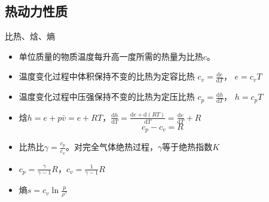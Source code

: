 \subsection{热动力性质}
\begin{frame}{比热、焓、熵}
  \begin{itemize}[<+-|alert@+>]
    \item 单位质量的物质温度每升高一度所需的热量为{\color{blue}比热\color{red}$c$}。
    \item 温度变化过程中体积保持不变的比热为{\color{blue}定容比热
      \color{red}$\displaystyle c_{v} = \frac{\mathrm{d}e}{\mathrm{d}T}$}，
      $e=c_{v}T$
    \item 温度变化过程中压强保持不变的比热为{\color{blue}定压比热
      \color{red}$\displaystyle c_{p}=\frac{\mathrm{d}h}{\mathrm{d}T} $}，
      $h=c_{p}T$
    \item {\color{blue}焓\color{red}$h= e + p\bar{v} = e + RT$}，$\displaystyle
      \frac{\mathrm{d} h}{\mathrm{d} T}
      =
      \frac{\mathrm{d} e + \mathrm{d}(RT)}{\mathrm{d} T}
      =
      \frac{\mathrm{d} e}{\mathrm{d} T}
      +
      R
      $
      \begin{equation*}
        c_{p} - c_{v} = R
      \end{equation*}
    \item {\color{blue}比热比\color{red}$\displaystyle \gamma=\frac{c_{p}}{c_{v}}$}。对完全气体绝热过程，$\gamma$等于绝热指数$K$
    \item $\displaystyle c_{p} = \frac{\gamma}{\gamma-1}R$，$\displaystyle c_{v}=\frac{1}{\gamma-1}R$
    \item {\color{blue}熵\color{red}$\displaystyle s = c_{v}\ln{\frac{p}{\rho^{\gamma}}}$}
  \end{itemize}
\end{frame}

